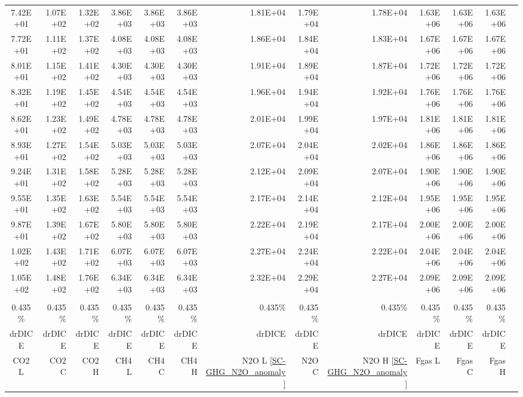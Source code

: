 \documentclass{article}
\begin{document}
\begin{table}
\begin{tabular}{crrr|rrr|rrr|rrr}
7.42E+01 & 1.07E+02 & 1.32E+02 & 3.86E+03 & 3.86E+03 & 3.86E+03 & 1.81E+04 & 1.79E+04 & 1.78E+04 & 1.63E+06 & 1.63E+06 & 1.63E+06 \\
7.72E+01 & 1.11E+02 & 1.37E+02 & 4.08E+03 & 4.08E+03 & 4.08E+03 & 1.86E+04 & 1.84E+04 & 1.83E+04 & 1.67E+06 & 1.67E+06 & 1.67E+06 \\
8.01E+01 & 1.15E+02 & 1.41E+02 & 4.30E+03 & 4.30E+03 & 4.30E+03 & 1.91E+04 & 1.89E+04 & 1.87E+04 & 1.72E+06 & 1.72E+06 & 1.72E+06 \\
8.32E+01 & 1.19E+02 & 1.45E+02 & 4.54E+03 & 4.54E+03 & 4.54E+03 & 1.96E+04 & 1.94E+04 & 1.92E+04 & 1.76E+06 & 1.76E+06 & 1.76E+06 \\
8.62E+01 & 1.23E+02 & 1.49E+02 & 4.78E+03 & 4.78E+03 & 4.78E+03 & 2.01E+04 & 1.99E+04 & 1.97E+04 & 1.81E+06 & 1.81E+06 & 1.81E+06 \\
8.93E+01 & 1.27E+02 & 1.54E+02 & 5.03E+03 & 5.03E+03 & 5.03E+03 & 2.07E+04 & 2.04E+04 & 2.02E+04 & 1.86E+06 & 1.86E+06 & 1.86E+06 \\
9.24E+01 & 1.31E+02 & 1.58E+02 & 5.28E+03 & 5.28E+03 & 5.28E+03 & 2.12E+04 & 2.09E+04 & 2.07E+04 & 1.90E+06 & 1.90E+06 & 1.90E+06 \\
9.55E+01 & 1.35E+02 & 1.63E+02 & 5.54E+03 & 5.54E+03 & 5.54E+03 & 2.17E+04 & 2.14E+04 & 2.12E+04 & 1.95E+06 & 1.95E+06 & 1.95E+06 \\
9.87E+01 & 1.39E+02 & 1.67E+02 & 5.80E+03 & 5.80E+03 & 5.80E+03 & 2.22E+04 & 2.19E+04 & 2.17E+04 & 2.00E+06 & 2.00E+06 & 2.00E+06 \\
1.02E+02 & 1.43E+02 & 1.71E+02 & 6.07E+03 & 6.07E+03 & 6.07E+03 & 2.27E+04 & 2.24E+04 & 2.22E+04 & 2.04E+06 & 2.04E+06 & 2.04E+06 \\
1.05E+02 & 1.48E+02 & 1.76E+02 & 6.34E+03 & 6.34E+03 & 6.34E+03 & 2.32E+04 & 2.29E+04 & 2.27E+04 & 2.09E+06 & 2.09E+06 & 2.09E+06 \\
         &          &          &          &          &          &          &          &          &          &          &          \\ \hline
0.435\%  & 0.435\%  & 0.435\%  & 0.435\%  & 0.435\%  & 0.435\%  & 0.435\%  & 0.435\%  & 0.435\%  & 0.435\%  & 0.435\%  & 0.435\%  \\
drDICE   & drDICE   & drDICE   & drDICE   & drDICE   & drDICE   & drDICE   & drDICE   & drDICE   & drDICE   & drDICE   & drDICE   \\
CO2 L    & CO2 C    & CO2 H    & CH4 L    & CH4 C    & CH4 H    & N2O L \ref{SC-GHG_N2O_anomaly}     & N2O C      & N2O H \ref{SC-GHG_N2O_anomaly}    & Fgas L   & Fgas C   & Fgas H   \\

\end{tabular}
\end{table}
\end{document}
